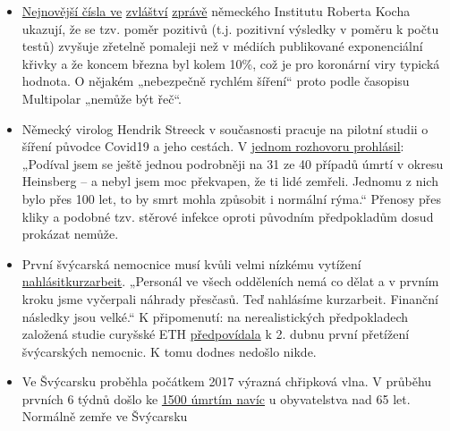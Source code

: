 \begin{itemize}
\tightlist
\item
  \href{https://multipolar-magazin.de/artikel/coronavirus-regierung-ignoriert-daten\%20/t\%20_blank}{Nejnovější
  čísla ve}
  \href{https://multipolar-magazin.de/artikel/coronavirus-regierung-ignoriert-daten\%20/t\%20_blank}{zvláštví}
  \href{https://multipolar-magazin.de/artikel/coronavirus-regierung-ignoriert-daten\%20/t\%20_blank}{zprávě}
  německého Institutu Roberta Kocha ukazují, že se tzv. poměr pozitivů
  (t.j. pozitivní výsledky v poměru k počtu testů) zvyšuje zřetelně
  pomaleji než v médiích publikované exponenciální křivky a že koncem
  března byl kolem 10\%, což je pro koronární viry typická hodnota. O
  nějakém „nebezpečně rychlém šíření`` proto podle časopisu Multipolar
  „nemůže být řeč``.
\item
  Německý virolog Hendrik Streeck v současnosti pracuje na pilotní
  studii o šíření původce Covid19 a jeho cestách. V
  \href{https://www.zeit.de/wissen/gesundheit/2020-04/hendrik-streeck-covid-19-heinsberg-symptome-infektionsschutz-massnahmen-studie/komplettansicht}{jednom
  rozhovoru prohlásil}: „Podíval jsem se ještě jednou podrobněji na 31
  ze 40 případů úmrtí v okresu Heinsberg -- a nebyl jsem moc překvapen,
  že ti lidé zemřeli. Jednomu z nich bylo přes 100 let, to by smrt mohla
  způsobit i normální rýma.`` Přenosy přes kliky a podobné tzv. stěrové
  infekce oproti původním předpokladům dosud prokázat nemůže.
\item
  První švýcarská nemocnice musí kvůli velmi nízkému vytížení
  \href{https://www.engadinerpost.ch/2020/4/04/Engadiner-Spitaeler-haben-freie-Kapazitaeten\%20/t\%20_blank}{nahlásit}\href{https://www.engadinerpost.ch/2020/4/04/Engadiner-Spitaeler-haben-freie-Kapazitaeten\%20/t\%20_blank}{kurzarbeit}.
  „Personál ve všech odděleních nemá co dělat a v prvním kroku jsme
  vyčerpali náhrady přesčasů. Teď nahlásíme kurzarbeit. Finanční
  následky jsou velké.`` K připomenutí: na nerealistických předpokladech
  založená studie curyšské ETH
  \href{https://www.toponline.ch/news/coronavirus/detail/news/studie-bestaetigt-engpass-bei-spitalbetten-steht-kurz-bevor-00131333/}{předpovídala}
  k 2. dubnu první přetížení švýcarských nemocnic. K tomu dodnes nedošlo
  nikde.
\item
  Ve Švýcarsku proběhla počátkem 2017 výrazná chřipková vlna. V průběhu
  prvních 6 týdnů došlo ke
  \href{https://www.srf.ch/news/schweiz/todesursachen-statistik-woran-die-meisten-schweizerinnen-und-schweizer-sterben}{1500
  úmrtím navíc} u obyvatelstva nad 65 let. Normálně zemře ve Švýcarsku

\end{itemize}
